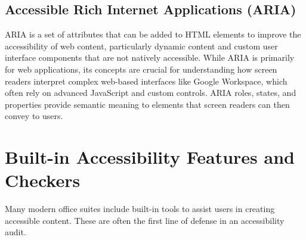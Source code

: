 \subsection{Accessible Rich Internet Applications (ARIA)}
\label{subsec:aria}
ARIA \cite{w3caria} is a set of attributes that can be added to HTML elements to improve the accessibility of web content, particularly dynamic content and custom user interface components that are not natively accessible. While ARIA is primarily for web applications, its concepts are crucial for understanding how screen readers interpret complex web-based interfaces like Google Workspace, which often rely on advanced JavaScript and custom controls. ARIA roles, states, and properties provide semantic meaning to elements that screen readers can then convey to users.

\section{Built-in Accessibility Features and Checkers}
\label{sec:office-accessibility-features}

Many modern office suites include built-in tools to assist users in creating accessible content. These are often the first line of defense in an accessibility audit.

